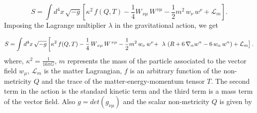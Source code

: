 \begin{equation}
\label{1}
S=\int d^4x\,\sqrt{-g}\left[\kappa^2\,f(Q,T)-\frac{1}{4}W_{\,\nu \mu}\,W^{\,\nu \mu}-
\frac{1}{2}m^2\,w_{\nu}\, w^\nu +\mathcal{L}_m\right].
\end{equation}
Imposing the Lagrange multiplier $\lambda$ in the gravitational action, we get

\begin{equation}
 \label{2}
 S=\int d^4x\,\sqrt{-g}\left[ \kappa^2\,f(Q,T)-\frac{1}{4}\,W_{\,\nu \mu}\,W^{\,\nu \mu}-\frac{1}{2}m^2\,w_\nu \,w^\nu+ \right.\\
\left. \lambda\,\left(R+6\,\nabla_\alpha w^\alpha-6\,w_\alpha \,w^\alpha\right)+\mathcal{L}_m\right].
\end{equation}
where, $\kappa^2=\frac{1}{16\pi G}$, $m$ represents the mass of the particle associated to the vector field $w_\mu$, $\mathcal{L}_m$ is the matter Lagrangian, $f$ is an arbitrary function of the non-metricity $Q$ and the trace of the matter-energy-momentum tensor $T$. The second term in the action is the standard kinetic term and the third term is a mass term of the vector field. Also $g=det(g_{\nu \mu})$ and the scalar non-metricity $Q$ is given by 

